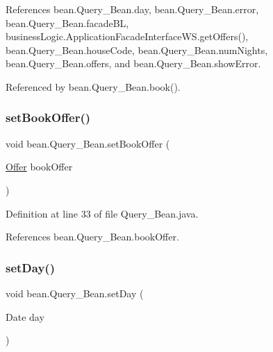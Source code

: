References bean.\+Query\+\_\+\+Bean.\+day, bean.\+Query\+\_\+\+Bean.\+error, bean.\+Query\+\_\+\+Bean.\+facade\+BL, business\+Logic.\+Application\+Facade\+Interface\+W\+S.\+get\+Offers(), bean.\+Query\+\_\+\+Bean.\+house\+Code, bean.\+Query\+\_\+\+Bean.\+num\+Nights, bean.\+Query\+\_\+\+Bean.\+offers, and bean.\+Query\+\_\+\+Bean.\+show\+Error.



Referenced by bean.\+Query\+\_\+\+Bean.\+book().

\mbox{\label{classbean_1_1Query__Bean_a1d4d548f29f696871171ff5d7eca964a}} 
\subsubsection{\texorpdfstring{setBookOffer()}{setBookOffer()}}
{\footnotesize\ttfamily void bean.\+Query\+\_\+\+Bean.\+set\+Book\+Offer (\begin{DoxyParamCaption}\item[{\mbox{\hyperlink{classdomain_1_1Offer}{Offer}}}]{book\+Offer }\end{DoxyParamCaption})}



Definition at line 33 of file Query\+\_\+\+Bean.\+java.


\begin{DoxyCode}{0}

\end{DoxyCode}


References bean.\+Query\+\_\+\+Bean.\+book\+Offer.

\mbox{\label{classbean_1_1Query__Bean_ab1e76631718151a10efad6a17c43cb5d}} 
\subsubsection{\texorpdfstring{setDay()}{setDay()}}
{\footnotesize\ttfamily void bean.\+Query\+\_\+\+Bean.\+set\+Day (\begin{DoxyParamCaption}\item[{Date}]{day }\end{DoxyParamCaption})}




